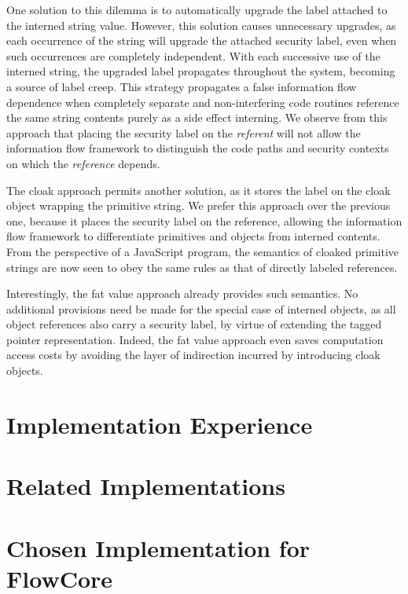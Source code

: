 One solution to this dilemma is to automatically upgrade the label attached to the interned string value.
However, this solution causes unnecessary upgrades, as each occurrence of the string will upgrade the attached security label, even when such occurrences are completely independent.
With each successive use of the interned string, the upgraded label propagates throughout the system, becoming a source of label creep.
This strategy propagates a false information flow dependence when completely separate and non-interfering code routines reference the same string contents purely as a side effect interning.
We observe from this approach that placing the security label on the \emph{referent} will not allow the information flow framework to distinguish the code paths and security contexts on which the \emph{reference} depends.

The cloak approach permits another solution, as it stores the label on the cloak object wrapping the primitive string.
We prefer this approach over the previous one, because it places the security label on the reference, allowing the information flow framework to differentiate primitives and objects from interned contents.
From the perspective of a JavaScript program, the semantics of cloaked primitive strings are now seen to obey the same rules as that of directly labeled references.

Interestingly, the fat value approach already provides such semantics.
No additional provisions need be made for the special case of interned objects, as all object references also carry a security label, by virtue of extending the tagged pointer representation.
Indeed, the fat value approach even saves computation access costs by avoiding the layer of indirection incurred by introducing cloak objects.


\section{Implementation Experience}
\label{sec:experience}

\section{Related Implementations}
\label{sec:related-work}

\section{Chosen Implementation for FlowCore}
\label{sec:conclusion}
